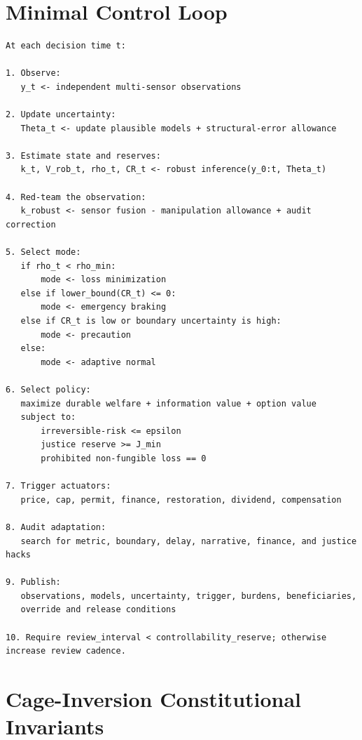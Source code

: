 \documentclass[11pt,a4paper]{article}
\numberwithin{equation}{section}
\theoremstyle{definition}
\theoremstyle{plain}
\theoremstyle{remark}
\begin{document}
\section{Minimal Control Loop}

\begin{lstlisting}[style=paperpseudo]
At each decision time t:

1. Observe:
   y_t <- independent multi-sensor observations

2. Update uncertainty:
   Theta_t <- update plausible models + structural-error allowance

3. Estimate state and reserves:
   k_t, V_rob_t, rho_t, CR_t <- robust inference(y_0:t, Theta_t)

4. Red-team the observation:
   k_robust <- sensor fusion - manipulation allowance + audit correction

5. Select mode:
   if rho_t < rho_min:
       mode <- loss minimization
   else if lower_bound(CR_t) <= 0:
       mode <- emergency braking
   else if CR_t is low or boundary uncertainty is high:
       mode <- precaution
   else:
       mode <- adaptive normal

6. Select policy:
   maximize durable welfare + information value + option value
   subject to:
       irreversible-risk <= epsilon
       justice reserve >= J_min
       prohibited non-fungible loss == 0

7. Trigger actuators:
   price, cap, permit, finance, restoration, dividend, compensation

8. Audit adaptation:
   search for metric, boundary, delay, narrative, finance, and justice hacks

9. Publish:
   observations, models, uncertainty, trigger, burdens, beneficiaries,
   override and release conditions

10. Require review_interval < controllability_reserve; otherwise increase review cadence.
\end{lstlisting}

\section{Cage-Inversion Constitutional Invariants}
\end{document}
